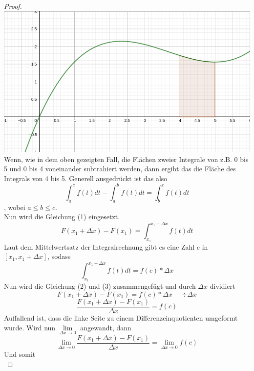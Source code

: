 \documentclass[fontsize=12pt,paper=a4,DIV12,cleardoublepage=empty, 
liststotoc,idxtotoc,bibtotoc]{article}
\theoremstyle{plain}
\theoremstyle{definition}
\begin{document}
\begin{proof}
		\includegraphics[scale=0.2]{Integral 4-5.png} \\
Wenn, wie in dem oben gezeigten Fall, die Flächen zweier Integrale von z.B. 0 bis 5 und 0 bis 4 voneinander subtrahiert werden, dann ergibt das die Fläche des Integrals von 4 bis 5. Generell ausgedrückt ist das also
		\begin{equation*}
			\int_{a}^{c}f(t)dt - \int_{a}^{b}f(t)dt = \int_{b}^{c}f(t)dt
		\end{equation*}
		, wobei $a\leq b\leq c$.\\
		Nun wird die Gleichung (1) eingesetzt.
		\begin{equation}
			F(x_1+\Delta x)-F(x_1)=\int_{x_1}^{x_1+\Delta x}f(t)dt
		\end{equation}
		Laut dem Mittelwertsatz der Integralrechnung gibt es eine Zahl c in $[x_1, x_1+\Delta x]$, sodass
		\begin{equation}
			\int_{x_1}^{x_1+\Delta x}f(t)dt=f(c)*\Delta x
		\end{equation}
		Nun wird die Gleichung (2) und (3) zusammengefügt und durch $\Delta x$ dividiert
		\begin{equation*}
			F(x_1+\Delta x)-F(x_1)=f(c)*\Delta x \;\;\;\;|\div \Delta x
		\end{equation*}
		\begin{equation*}
			\frac{F(x_1+\Delta x)-F(x_1)}{\Delta x}=f(c)
		\end{equation*}
		Auffallend ist, dass die linke Seite zu einem Differenzeinquotienten umgeformt wurde. Wird nun $\lim \limits_{\Delta x \to 0}$ angewandt, dann
		\begin{equation*}
			\lim \limits_{\Delta x \to 0} \frac{F(x_1+\Delta x)-F(x_1)}{\Delta x}=\lim \limits_{\Delta x \to 0}f(c)
		\end{equation*}
		Und somit
		\begin{equation}

\end{equation}
\end{proof}
\end{document}
